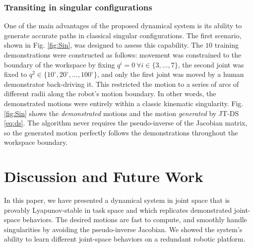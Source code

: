 \documentclass[letterpaper, 10 pt, conference,fleqn]{ieeeconf}
\begin{document}
\begin{table}[h]
	\vspace{0.1cm}
	\label{table:2}
	\centering
		\caption{  Each simulated trajectory is initialized at $q=[0~\dots~0]^T$. The convergence duration is the time required to move within $0.001$m of the target. The normalized convergence duration is the convergence duration divided by the distance between the initial and target positions.}
\end{table}




\subsubsection{Transiting in singular configurations}
One of the main advantages of the proposed dynamical system is its ability to generate accurate paths in classical singular configurations. The first scenario, shown in Fig. \ref{fig:Sin}, was designed to assess this capability. The $10$ training demonstrations were constructed as follows: movement was constrained to the boundary of the workspace by fixing $ q^i=0~\forall i\in\{3,\dots,7\}$, the second joint was fixed to $q^2\in\{10^\circ,20^\circ,\dots,100^\circ\}$, and only the first joint was moved by a human demonstrator back-driving it. This restricted the motion to a series of arcs of different radii along the robot's motion boundary. In other words, the demonstrated motions were entirely within a classic kinematic singularity. Fig. \ref{fig:Sin} shows the \textit{demonstrated} motions and the motion  \textit{generated} by JT-DS \eqref{eq:ds}. The algorithm never requires the pseudo-inverse of the Jacobian matrix, so the generated motion perfectly follows the demonstrations throughout the workspace boundary.

\section{Discussion and Future Work} 
\label{Sec:Dis}
In this paper, we have presented a dynamical system in joint space that is provably Lyapunov-stable in task space and which replicates demonstrated joint-space behaviors. The desired motions are fast to compute, and smoothly handle singularities by avoiding the pseudo-inverse Jacobian. We showed the system's ability to learn different joint-space behaviors on a redundant robotic platform.
\end{document}
